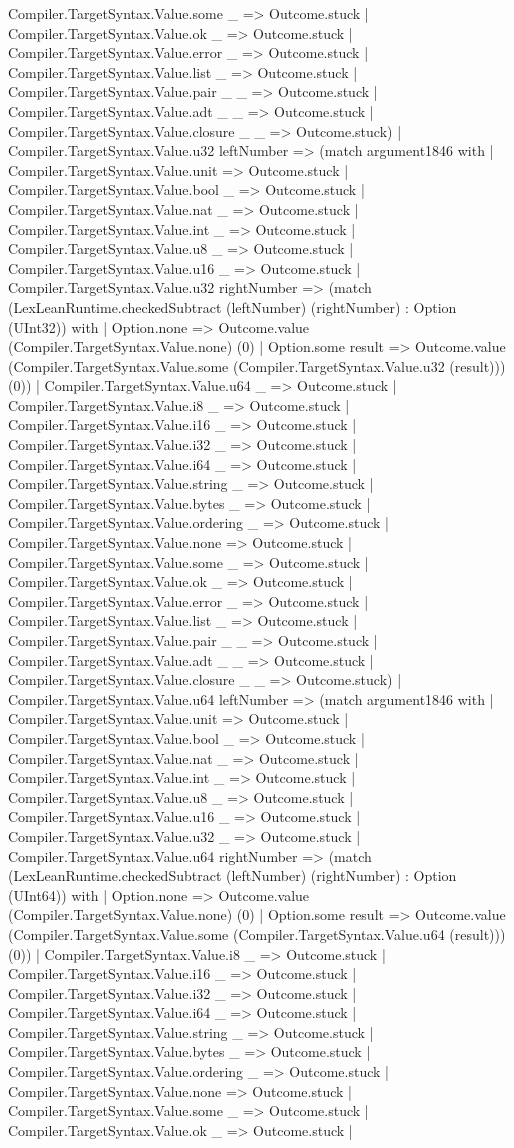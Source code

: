 \documentclass[11pt]{article}
\begin{document}
Compiler.TargetSyntax.Value.some \_ => Outcome.stuck | Compiler.TargetSyntax.Value.ok \_ => Outcome.stuck | Compiler.TargetSyntax.Value.error \_ => Outcome.stuck | Compiler.TargetSyntax.Value.list \_ => Outcome.stuck | Compiler.TargetSyntax.Value.pair \_ \_ => Outcome.stuck | Compiler.TargetSyntax.Value.adt \_ \_ => Outcome.stuck | Compiler.TargetSyntax.Value.closure \_ \_ => Outcome.stuck) | Compiler.TargetSyntax.Value.u32 leftNumber => (match argument1846 with | Compiler.TargetSyntax.Value.unit => Outcome.stuck | Compiler.TargetSyntax.Value.bool \_ => Outcome.stuck | Compiler.TargetSyntax.Value.nat \_ => Outcome.stuck | Compiler.TargetSyntax.Value.int \_ => Outcome.stuck | Compiler.TargetSyntax.Value.u8 \_ => Outcome.stuck | Compiler.TargetSyntax.Value.u16 \_ => Outcome.stuck | Compiler.TargetSyntax.Value.u32 rightNumber => (match (LexLeanRuntime.checkedSubtract (leftNumber) (rightNumber) : Option (UInt32)) with | Option.none => Outcome.value (Compiler.TargetSyntax.Value.none) (0) | Option.some result => Outcome.value (Compiler.TargetSyntax.Value.some (Compiler.TargetSyntax.Value.u32 (result))) (0)) | Compiler.TargetSyntax.Value.u64 \_ => Outcome.stuck | Compiler.TargetSyntax.Value.i8 \_ => Outcome.stuck | Compiler.TargetSyntax.Value.i16 \_ => Outcome.stuck | Compiler.TargetSyntax.Value.i32 \_ => Outcome.stuck | Compiler.TargetSyntax.Value.i64 \_ => Outcome.stuck | Compiler.TargetSyntax.Value.string \_ => Outcome.stuck | Compiler.TargetSyntax.Value.bytes \_ => Outcome.stuck | Compiler.TargetSyntax.Value.ordering \_ => Outcome.stuck | Compiler.TargetSyntax.Value.none => Outcome.stuck | Compiler.TargetSyntax.Value.some \_ => Outcome.stuck | Compiler.TargetSyntax.Value.ok \_ => Outcome.stuck | Compiler.TargetSyntax.Value.error \_ => Outcome.stuck | Compiler.TargetSyntax.Value.list \_ => Outcome.stuck | Compiler.TargetSyntax.Value.pair \_ \_ => Outcome.stuck | Compiler.TargetSyntax.Value.adt \_ \_ => Outcome.stuck | Compiler.TargetSyntax.Value.closure \_ \_ => Outcome.stuck) | Compiler.TargetSyntax.Value.u64 leftNumber => (match argument1846 with | Compiler.TargetSyntax.Value.unit => Outcome.stuck | Compiler.TargetSyntax.Value.bool \_ => Outcome.stuck | Compiler.TargetSyntax.Value.nat \_ => Outcome.stuck | Compiler.TargetSyntax.Value.int \_ => Outcome.stuck | Compiler.TargetSyntax.Value.u8 \_ => Outcome.stuck | Compiler.TargetSyntax.Value.u16 \_ => Outcome.stuck | Compiler.TargetSyntax.Value.u32 \_ => Outcome.stuck | Compiler.TargetSyntax.Value.u64 rightNumber => (match (LexLeanRuntime.checkedSubtract (leftNumber) (rightNumber) : Option (UInt64)) with | Option.none => Outcome.value (Compiler.TargetSyntax.Value.none) (0) | Option.some result => Outcome.value (Compiler.TargetSyntax.Value.some (Compiler.TargetSyntax.Value.u64 (result))) (0)) | Compiler.TargetSyntax.Value.i8 \_ => Outcome.stuck | Compiler.TargetSyntax.Value.i16 \_ => Outcome.stuck | Compiler.TargetSyntax.Value.i32 \_ => Outcome.stuck | Compiler.TargetSyntax.Value.i64 \_ => Outcome.stuck | Compiler.TargetSyntax.Value.string \_ => Outcome.stuck | Compiler.TargetSyntax.Value.bytes \_ => Outcome.stuck | Compiler.TargetSyntax.Value.ordering \_ => Outcome.stuck | Compiler.TargetSyntax.Value.none => Outcome.stuck | Compiler.TargetSyntax.Value.some \_ => Outcome.stuck | Compiler.TargetSyntax.Value.ok \_ => Outcome.stuck | 
\end{document}
